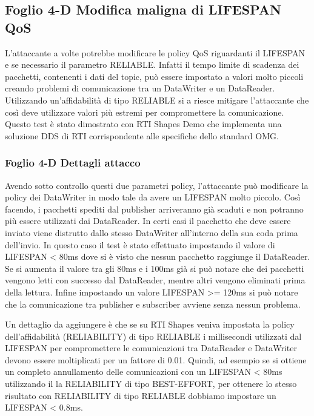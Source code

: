 \subsection{Foglio 4-D Modifica maligna di LIFESPAN QoS}
L'attaccante a volte potrebbe modificare le policy QoS riguardanti il
LIFESPAN e se necessario il parametro RELIABLE.
Infatti il tempo limite di scadenza dei pacchetti, contenenti i dati del topic,
può essere impostato a valori molto piccoli creando problemi di comunicazione
tra un DataWriter e un DataReader. Utilizzando un'affidabilità di tipo RELIABLE
si a riesce mitigare l'attaccante che così deve utilizzare valori più estremi
per compromettere
la comunicazione. Questo test è stato dimostrato con RTI Shapes Demo che 
implementa una
soluzione DDS di RTI corrispondente alle specifiche dello standard OMG.



\subsubsection{Foglio 4-D Dettagli attacco}
Avendo sotto controllo questi due parametri policy, l'attaccante può modificare la
policy dei DataWriter in modo tale da avere un LIFESPAN molto piccolo. Così
facendo, i pacchetti spediti dal publisher arriveranno già scaduti e non potranno più
essere utilizzati dai DataReader. In certi casi il pacchetto che deve essere inviato
viene distrutto dallo stesso DataWriter all'interno della sua coda prima dell'invio. 
In questo caso il test è stato effettuato impostando il valore di
LIFESPAN < 80ms dove si è visto che nessun pacchetto raggiunge il DataReader.
Se si aumenta il valore tra gli 80ms e i 100ms già si può notare che dei pacchetti
vengono letti con successo dal DataReader, mentre altri vengono eliminati prima
della lettura. Infine impostando un valore LIFESPAN >= 120ms si può notare che
la comunicazione tra publisher e subscriber avviene senza nessun problema.


Un dettaglio da aggiungere è che se su RTI Shapes veniva impostata la policy
dell'affidabilità (RELIABILITY) di tipo RELIABLE i millisecondi utilizzati
dal LIFESPAN per compromettere le comunicazioni tra DataReader e DataWriter
devono essere moltiplicati per un fattore di 0.01. Quindi, ad esempio se si
ottiene un completo annullamento delle comunicazioni con un LIFESPAN < 80ms
utilizzando il la RELIABILITY di tipo BEST-EFFORT, per ottenere lo stesso
risultato con RELIABILITY di tipo RELIABLE dobbiamo impostare un
LIFESPAN < 0.8ms.


